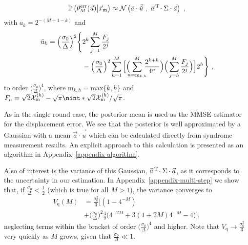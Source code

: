 \documentclass[prx,reprint,superscriptaddress,longbibliography,floatfix,nofootinbib]{revtex4-1}
\DeclarePairedDelimiter{\nint}\lfloor\rceil
\begin{document}
\begin{equation}
\mathbb{P}\left(\theta_M^{\mathrm{err}}(\vec{u}) \big| \vec{x}_{\text{m}}\right) \approx \mathcal{N}\left(\vec{a}\cdot\vec{\tilde{u}} \ , \ \vec{a}^{\hspace{0.05cm}\text{T}}\hspace{-0.05cm} 
   \cdot\Sigma\cdot
    \vec{a} \right) \ ,
\end{equation}
\noindent with $a_{k} = 2^{-(M+1-k)}$ and
%
\begin{equation}
    \begin{split}
    \tilde{u}_{k} = \Big(\frac{\sigma_0}{\Delta}\Big)^2 \Bigg\{& 2^{k}\sum_{j=1}^{M}\frac{F_j}{2^j} \\ 
    & - \Big(\frac{\sigma_0}{\Delta}\Big)^2\sum_{h=1}^{M}\Big[\Big(\hspace{-0.2cm}\sum_{n=\text{m}_{k,h}}^{M}\hspace{-0.2cm}\frac{2^{k+h}}{4^n}\Big)\Big(\sum_{j=h}^{M}\frac{F_j}{2^j}\Big)\Big]2^{h}\Bigg\} \ , 
    \end{split}
    \label{eq:u_tilde_k}
\end{equation}
%
\noindent to order $\big(\frac{\sigma_0}{\Delta}\big)^4$, where $\text{m}_{k,h} = \text{max}\{k,h\}$ and $F_h = \sqrt{2}\mathcal{X}_\text{m}^{(h)}-\sqrt{\pi}\nint*{\sqrt{2}\mathcal{X}_\text{m}^{(h)}/\sqrt{\pi}}$.
%

As in the single round case, the posterior mean is used as the MMSE estimator for the displacement error.
We see that the posterior is well approximated by a Gaussian with a mean $\vec{a}\cdot\vec{\tilde{u}}$ which can be calculated directly from syndrome measurement results. An explicit approach to this calculation is presented as an algorithm in Appendix\ \ref{appendix-algorithm}.

Also of interest is the variance of this Gaussian, $\vec{a}^{\hspace{0.05cm}\text{T}}\hspace{-0.05cm} \cdot\Sigma\cdot \vec{a}$, as it corresponds to the uncertainty in our estimation.
In Appendix\ \ref{appendix-multi-step} we show that, if $\frac{\sigma_0}{\Delta} < \frac{1}{2}$ (which is true for all $M>1$), the variance converges to
%
\begin{equation}
\label{eq:var_q_multiple_steps1}
\begin{split}
V_\text{q}(M) & = \frac{\sigma_{0}^2}{3}\Big[(1-4^{-M}) \\ 
& + \Big(\frac{\sigma_0}{\Delta}\Big)^{2}\frac{4}{9}\big(4^{-2M} + 3(1+2M)4^{-M} -4\big) \Big],
\end{split}
\end{equation}
%
\noindent neglecting terms within the bracket of order $\big( \frac{\sigma_0}{\Delta} \big)^4$ and higher. Note that $V_\text{q} \rightarrow \frac{\sigma_{0}^2}{3}$ very quickly as $M$ grows, given that $\frac{\sigma_0}{\Delta} \ll 1$. 
\end{document}
